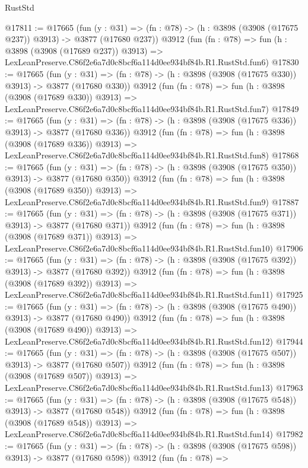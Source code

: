 \begin{lexlean}{RustStd}
\begin{coremodule}
@17811 := @17665
    (fun (y : @31) => (fn : @78) -> (h : @3898 (@3908 (@17675 @237)) @3913) -> @3877 (@17680 @237))
    @3912
    (fun (fn : @78) =>
    fun (h : @3898 (@3908 (@17689 @237)) @3913) =>
    LexLeanPreserve.C86f2e6a7d0c8bcf6a114d0ee934bf84b.R1.RustStd.fun6)
@17830 := @17665
    (fun (y : @31) => (fn : @78) -> (h : @3898 (@3908 (@17675 @330)) @3913) -> @3877 (@17680 @330))
    @3912
    (fun (fn : @78) =>
    fun (h : @3898 (@3908 (@17689 @330)) @3913) =>
    LexLeanPreserve.C86f2e6a7d0c8bcf6a114d0ee934bf84b.R1.RustStd.fun7)
@17849 := @17665
    (fun (y : @31) => (fn : @78) -> (h : @3898 (@3908 (@17675 @336)) @3913) -> @3877 (@17680 @336))
    @3912
    (fun (fn : @78) =>
    fun (h : @3898 (@3908 (@17689 @336)) @3913) =>
    LexLeanPreserve.C86f2e6a7d0c8bcf6a114d0ee934bf84b.R1.RustStd.fun8)
@17868 := @17665
    (fun (y : @31) => (fn : @78) -> (h : @3898 (@3908 (@17675 @350)) @3913) -> @3877 (@17680 @350))
    @3912
    (fun (fn : @78) =>
    fun (h : @3898 (@3908 (@17689 @350)) @3913) =>
    LexLeanPreserve.C86f2e6a7d0c8bcf6a114d0ee934bf84b.R1.RustStd.fun9)
@17887 := @17665
    (fun (y : @31) => (fn : @78) -> (h : @3898 (@3908 (@17675 @371)) @3913) -> @3877 (@17680 @371))
    @3912
    (fun (fn : @78) =>
    fun (h : @3898 (@3908 (@17689 @371)) @3913) =>
    LexLeanPreserve.C86f2e6a7d0c8bcf6a114d0ee934bf84b.R1.RustStd.fun10)
@17906 := @17665
    (fun (y : @31) => (fn : @78) -> (h : @3898 (@3908 (@17675 @392)) @3913) -> @3877 (@17680 @392))
    @3912
    (fun (fn : @78) =>
    fun (h : @3898 (@3908 (@17689 @392)) @3913) =>
    LexLeanPreserve.C86f2e6a7d0c8bcf6a114d0ee934bf84b.R1.RustStd.fun11)
@17925 := @17665
    (fun (y : @31) => (fn : @78) -> (h : @3898 (@3908 (@17675 @490)) @3913) -> @3877 (@17680 @490))
    @3912
    (fun (fn : @78) =>
    fun (h : @3898 (@3908 (@17689 @490)) @3913) =>
    LexLeanPreserve.C86f2e6a7d0c8bcf6a114d0ee934bf84b.R1.RustStd.fun12)
@17944 := @17665
    (fun (y : @31) => (fn : @78) -> (h : @3898 (@3908 (@17675 @507)) @3913) -> @3877 (@17680 @507))
    @3912
    (fun (fn : @78) =>
    fun (h : @3898 (@3908 (@17689 @507)) @3913) =>
    LexLeanPreserve.C86f2e6a7d0c8bcf6a114d0ee934bf84b.R1.RustStd.fun13)
@17963 := @17665
    (fun (y : @31) => (fn : @78) -> (h : @3898 (@3908 (@17675 @548)) @3913) -> @3877 (@17680 @548))
    @3912
    (fun (fn : @78) =>
    fun (h : @3898 (@3908 (@17689 @548)) @3913) =>
    LexLeanPreserve.C86f2e6a7d0c8bcf6a114d0ee934bf84b.R1.RustStd.fun14)
@17982 := @17665
    (fun (y : @31) => (fn : @78) -> (h : @3898 (@3908 (@17675 @598)) @3913) -> @3877 (@17680 @598))
    @3912
    (fun (fn : @78) =>

\end{coremodule}
\end{lexlean}
